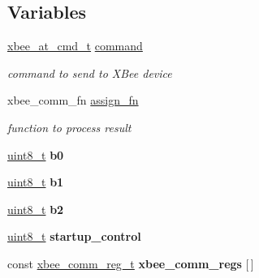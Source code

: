 \subsection*{Variables}
\begin{DoxyCompactItemize}
\item 
\mbox{\label{group__xbee__commissioning_gaa1e66c60bb56acaced6ca2646fd44616}} 
\hyperlink{unionxbee__at__cmd__t}{xbee\+\_\+at\+\_\+cmd\+\_\+t} \hyperlink{group__xbee__commissioning_gaa1e66c60bb56acaced6ca2646fd44616}{command}
\begin{DoxyCompactList}\small\item\em command to send to X\+Bee device \end{DoxyCompactList}\item 
\mbox{\label{group__xbee__commissioning_ga7cde42d4d91d04d62d5810e84cde3228}} 
xbee\+\_\+comm\+\_\+fn \hyperlink{group__xbee__commissioning_ga7cde42d4d91d04d62d5810e84cde3228}{assign\+\_\+fn}
\begin{DoxyCompactList}\small\item\em function to process result \end{DoxyCompactList}\item 
\mbox{\label{group__xbee__commissioning_ga9428f4229e2203fa643916ca52a3e663}} 
\hyperlink{group__hal__dos_gae1affc9ca37cfb624959c866a73f83c2}{uint8\+\_\+t} {\bfseries b0}
\item 
\mbox{\label{group__xbee__commissioning_gac252074002fd2018498430cf078d3c48}} 
\hyperlink{group__hal__dos_gae1affc9ca37cfb624959c866a73f83c2}{uint8\+\_\+t} {\bfseries b1}
\item 
\mbox{\label{group__xbee__commissioning_gaf1d156a71c42f5c2c5b2554084b0b6de}} 
\hyperlink{group__hal__dos_gae1affc9ca37cfb624959c866a73f83c2}{uint8\+\_\+t} {\bfseries b2}
\item 
\mbox{\label{group__xbee__commissioning_ga959afae272eb1d7a12fad05cb5e55ec7}} 
\hyperlink{group__hal__dos_gae1affc9ca37cfb624959c866a73f83c2}{uint8\+\_\+t} {\bfseries startup\+\_\+control}
\item 
const \hyperlink{structxbee__comm__reg__t}{xbee\+\_\+comm\+\_\+reg\+\_\+t} {\bfseries xbee\+\_\+comm\+\_\+regs} \mbox{[}$\,$\mbox{]}
\end{DoxyCompactItemize}


